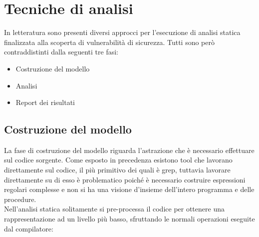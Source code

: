 \section{Tecniche di analisi}
In letteratura sono presenti diversi approcci per l'esecuzione di analisi statica finalizzata alla scoperta di vulnerabilità di sicurezza. Tutti sono però contraddistinti dalla seguenti tre fasi:
\begin{itemize}
\item Costruzione del modello
\item Analisi
\item Report dei risultati
\end{itemize}

\subsection{Costruzione del modello}
La fase di costruzione del modello riguarda l'astrazione che è necessario effettuare sul codice sorgente. Come esposto in precedenza esistono tool che lavorano direttamente sul codice, il più primitivo dei quali è grep, tuttavia lavorare direttamente su di esso è problematico poiché è necessario costruire espressioni regolari complesse e non si ha una visione d'insieme dell'intero programma e delle procedure.\\
Nell'analisi statica solitamente si pre-processa il codice per ottenere una rappresentazione ad un livello più basso, sfruttando le normali operazioni eseguite dal compilatore:
